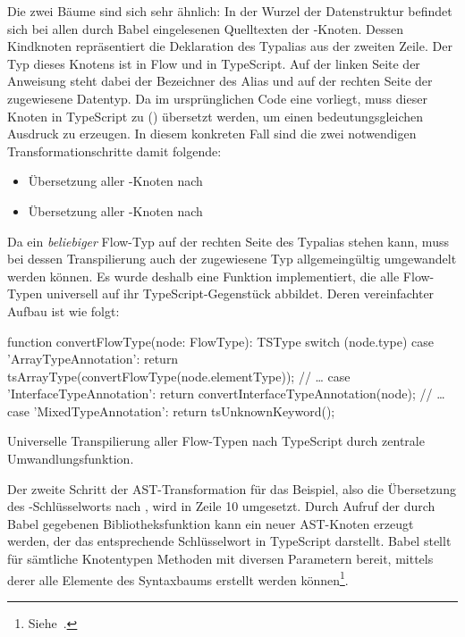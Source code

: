 Die zwei Bäume sind sich sehr ähnlich: In der Wurzel der Datenstruktur befindet sich bei allen durch Babel eingelesenen Quelltexten der -Knoten. Dessen Kindknoten repräsentiert die Deklaration des Typalias aus der zweiten Zeile. Der Typ dieses Knotens ist  in Flow und  in TypeScript. Auf der linken Seite der Anweisung steht dabei der Bezeichner des Alias und auf der rechten Seite der zugewiesene Datentyp. Da im ursprünglichen Code eine  vorliegt, muss dieser Knoten in TypeScript zu  () übersetzt werden, um einen bedeutungsgleichen Ausdruck zu erzeugen. In diesem konkreten Fall sind die zwei notwendigen Transformationschritte damit folgende:

\begin{itemize}
  \item Übersetzung aller -Knoten nach 
  \item Übersetzung aller -Knoten nach 
\end{itemize}

Da ein \emph{beliebiger} Flow-Typ auf der rechten Seite des Typalias stehen kann, muss bei dessen Transpilierung auch der zugewiesene Typ allgemeingültig umgewandelt werden können. Es wurde deshalb eine Funktion implementiert, die alle Flow-Typen universell auf ihr TypeScript-Gegenstück abbildet. Deren vereinfachter Aufbau ist wie folgt:

\bigbreak
\begin{listing}[htb]
\begin{textcode}
function convertFlowType(node: FlowType): TSType {
  switch (node.type) {
    case 'ArrayTypeAnnotation':
      return tsArrayType(convertFlowType(node.elementType));
    // …
    case 'InterfaceTypeAnnotation':
      return convertInterfaceTypeAnnotation(node);
    // …
    case 'MixedTypeAnnotation':
      return tsUnknownKeyword();
  }
}
\end{textcode}
\listingvspace
\caption{Universelle Transpilierung aller Flow-Typen nach TypeScript durch zentrale Umwandlungsfunktion.}
\label{code:convert-flow-type}
\end{listing}

Der zweite Schritt der AST-Transformation für das Beispiel, also die Übersetzung des -Schlüsselworts nach , wird in Zeile 10 umgesetzt. Durch Aufruf der durch Babel gegebenen Bibliotheksfunktion  kann ein neuer AST-Knoten erzeugt werden, der das entsprechende Schlüsselwort in TypeScript darstellt. Babel stellt für sämtliche Knotentypen Methoden mit diversen Parametern bereit, mittels derer alle Elemente des Syntaxbaums erstellt werden können\footnote{Siehe~\autocite{BABEL:TYPES}.}.

